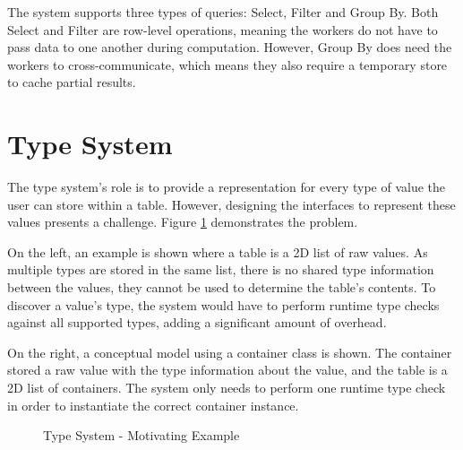 The system supports three types of queries: Select, Filter and Group By. Both Select and Filter are row-level operations, meaning the workers do not have to pass data to one another during computation. However, Group By does need the workers to cross-communicate, which means they also require a temporary store to cache partial results.

\section{Type System}\label{sec:type-system}
The type system's role is to provide a representation for every type of value the user can store within a table. However, designing the interfaces to represent these values presents a challenge. Figure \ref{fig:type-system-motivation} demonstrates the problem. 

On the left, an example is shown where a table is a 2D list of raw values. As multiple types are stored in the same list, there is no shared type information between the values, they cannot be used to determine the table's contents. To discover a value's type, the system would have to perform runtime type checks against all supported types, adding a significant amount of overhead. 

On the right, a conceptual model using a container class is shown. The container stored a raw value with the type information about the value, and the table is a 2D list of containers. The system only needs to perform one runtime type check in order to instantiate the correct container instance. 

\begin{figure}[htp]
	\centering
	\centering
	\qquad
	\caption{Type System - Motivating Example}
	\label{fig:type-system-motivation}
\end{figure}


